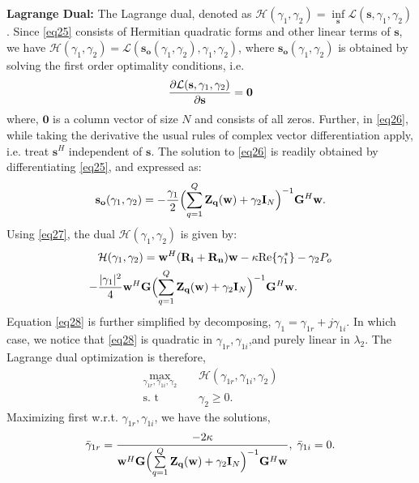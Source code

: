 \documentclass[11pt,draftclsnofoot,onecolumn]{IEEEtran}
\theoremstyle{definition}
\theoremstyle{remark}
\begin{document}
{\bf Lagrange Dual:} The Lagrange dual, denoted as $\mathcal{H}(\gamma_1,\gamma_2)=\inf\limits_{\mathbf{s}} \mathcal{L}( \mathbf{s},\gamma_1,\gamma_2)$. Since \eqref{eq25} consists of Hermitian quadratic forms and other linear terms of $\mathbf{s}$, we have $\mathcal{H}(\gamma_1,\gamma_2)=\mathcal{L}(\mathbf{s_o}(\gamma_1,\gamma_2),\gamma_1,\gamma_2)$, where $\mathbf{s_o}(\gamma_1,\gamma_2)$ is obtained by solving the first order optimality conditions, i.e.
\begin{align} \label{eq26}
\frac{\partial \mathcal{L}(\mathbf{s},\gamma_1,\gamma_2)}{\partial \mathbf{s}} ={\bf 0}
\end{align}
where, $\mathbf{0}$ is a  column vector of size $N$ and consists of all zeros. Further, in \eqref{eq26}, while taking the derivative the usual rules of complex vector differentiation apply, i.e. treat $\mathbf{s}^H$ independent of $\mathbf{s}$. The solution to \eqref{eq26} is readily obtained by differentiating \eqref{eq25}, and expressed as:
\begin{align} \label{eq27}
\mathbf{s_o}(\gamma_1,\gamma_2)=-\frac{\gamma_1}{2}\Bigl( \sum\limits_{q=1}^Q \mathbf{Z_q}( \mathbf{w})+\gamma_2\mathbf{I}_N\Bigr)^{-1}\mathbf{G}^H\mathbf{w}.
\end{align}
Using \eqref{eq27}, the dual $\mathcal{H}(\gamma_1,\gamma_2)$ is given by:
\begin{align} \label{eq28}
&\mathcal{H}( \gamma_1,\gamma_2)= \mathbf{w}^H( \mathbf{R_i+R_n})\mathbf{w} -\kappa\mbox{Re}\{ \gamma_1^\ast \}-\gamma_2P_o \nonumber \\
-&\frac{|\gamma_1|^2}{4} \mathbf{w}^H\mathbf{G} \Bigl( \sum\limits_{q=1}^Q \mathbf{Z_q}( \mathbf{w})+\gamma_2\mathbf{I}_N\Bigr)^{-1}\mathbf{G}^H\mathbf{w}.
\end{align} 
Equation \eqref{eq28} is further simplified by decomposing, $\gamma_1=\gamma_{1r}+j\gamma_{1i}$. In which case, we notice that \eqref{eq28} is quadratic in $\gamma_{1r},\gamma_{1i}$,and purely linear in $\lambda_2$. The Lagrange dual optimization is therefore, 
\begin{align} \label{eq29}
\max \limits_{\gamma_{1r},\gamma_{1i},\gamma_2} \;\;\;\; &\mathcal{H}(\gamma_{1r},\gamma_{1i},\gamma_2) \nonumber \\
\mbox{s. t } \;\;\;\; &\gamma_2\geq0.
\end{align}
Maximizing first w.r.t. $\gamma_{1r},\gamma_{1i}$, we have the solutions,
\begin{align*}
\bar{\gamma}_{1r}=\frac{-2\kappa}{\mathbf{w}^H\mathbf{G} \Bigl( \sum\limits_{q=1}^Q \mathbf{Z_q}( \mathbf{w})+\gamma_2\mathbf{I}_N\Bigr)^{-1}\mathbf{G}^H\mathbf{w}},\;\bar{\gamma}_{1i}=0.
\end{align*}
\end{document}

